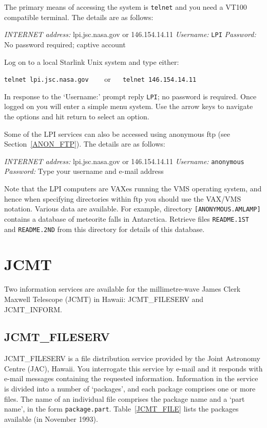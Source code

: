 \documentclass[twoside,11pt,nolof]{starlink}
\begin{document}
The primary means of accessing the system is \texttt{telnet} and you need
a VT100 compatible terminal. The details are as follows:

\textit{INTERNET address: } lpi.jsc.nasa.gov or 146.154.14.11
\newline \textit{Username:} \verb-LPI-
\newline \textit{Password:} No password required; captive account

Log on to a local Starlink Unix system and type either:

\vspace{2.0 mm}
\verb:telnet lpi.jsc.nasa.gov : ~~ or ~~ \verb:telnet 146.154.14.11:
\vspace{2.0 mm}

In response to the `Username:' prompt reply \texttt{LPI}; no password is
required. Once logged on you will enter a simple menu system. Use the
arrow keys to navigate the options and hit return to select an option.

Some of the LPI services can also be accessed using anonymous ftp (see
Section~\ref{ANON_FTP}). The details are as follows:

\textit{INTERNET address: } lpi.jsc.nasa.gov or 146.154.14.11
\newline \textit{Username:} \verb-anonymous-
\newline \textit{Password:} Type your username and e-mail address

Note that the LPI computers are VAXes running the VMS operating system,
and hence when specifying directories within ftp you should use the
VAX/VMS notation. Various data are available. For example, directory
\texttt{[ANONYMOUS.AMLAMP]} contains a database of meteorite falls in
Antarctica. Retrieve files \texttt{README.1ST} and \texttt{README.2ND} from
this directory for details of this database.


\section{JCMT}

Two information services are available for the millimetre-wave James
Clerk Maxwell Telescope (JCMT) in Hawaii: JCMT\_FILESERV and
JCMT\_INFORM.

\subsection{JCMT\_FILESERV}

JCMT\_FILESERV is a file distribution service provided by the Joint
Astronomy Centre (JAC), Hawaii. You interrogate this service by e-mail
and it responds with e-mail messages containing the requested
information. Information in the service is divided into a number of
`packages', and each package comprises one or more files. The name
of an individual file comprises the package name and a `part name', in
the form \texttt{package.part}. Table~\ref{JCMT_FILE} lists the packages
available (in November 1993).
\end{document}
